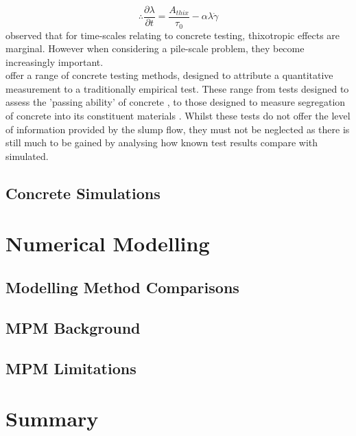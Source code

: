 \begin{equation}
\therefore
\frac{\partial \lambda}{\partial t}=\frac{A_{thix}}{\tau_0}-\alpha\lambda\dot{\gamma}
\label{eq:thixdt}
\end{equation}
\noindent
\citet{roussel07} observed that for time-scales relating to concrete testing, thixotropic effects are marginal. However when considering a pile-scale problem, they become increasingly important.\\
\newline
\noindent
\citet{Sperwall} offer a range of concrete testing methods, designed to attribute a quantitative measurement to a traditionally empirical test. These range from tests designed to assess the 'passing ability' of concrete \citeauthor{BS1235010}, to those designed to measure segregation of concrete into its constituent materials \citeauthor{ASTMbleed}. Whilst these tests do not offer the level of information provided by the slump flow, they must not be neglected as there is still much to be gained by analysing how known test results compare with simulated.














\subsection{Concrete Simulations}
\section{Numerical Modelling}
\subsection{Modelling Method Comparisons}
\subsection{MPM Background}
\subsection{MPM Limitations}
\section{Summary}
